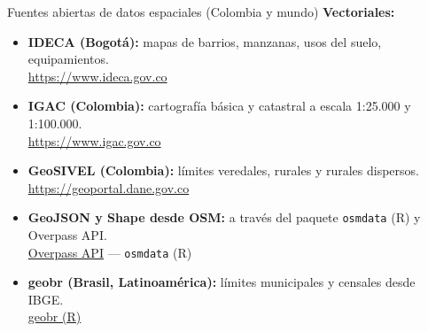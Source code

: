 \documentclass{beamer}
\begin{document}
\begin{frame}{Fuentes abiertas de datos espaciales (Colombia y mundo)}
\small
\textbf{Vectoriales:}
\begin{itemize}
    \item \textbf{IDECA (Bogotá):} mapas de barrios, manzanas, usos del suelo, equipamientos. \\
    \href{https://www.ideca.gov.co}{https://www.ideca.gov.co}
    
    \item \textbf{IGAC (Colombia):} cartografía básica y catastral a escala 1:25.000 y 1:100.000. \\
    \href{https://www.igac.gov.co}{https://www.igac.gov.co}
    
    \item \textbf{GeoSIVEL (Colombia):} límites veredales, rurales y rurales dispersos. \\
    \href{https://geoportal.dane.gov.co}{https://geoportal.dane.gov.co}

    \item \textbf{GeoJSON y Shape desde OSM:} a través del paquete \texttt{osmdata} (R) y Overpass API. \\
    \href{https://wiki.openstreetmap.org/wiki/Overpass_API}{Overpass API} — \texttt{osmdata} (R)

    \item \textbf{geobr (Brasil, Latinoamérica):} límites municipales y censales desde IBGE. \\
    \href{https://github.com/ipeaGIT/geobr}{geobr (R)}
\end{itemize}
\end{frame}
\end{document}
